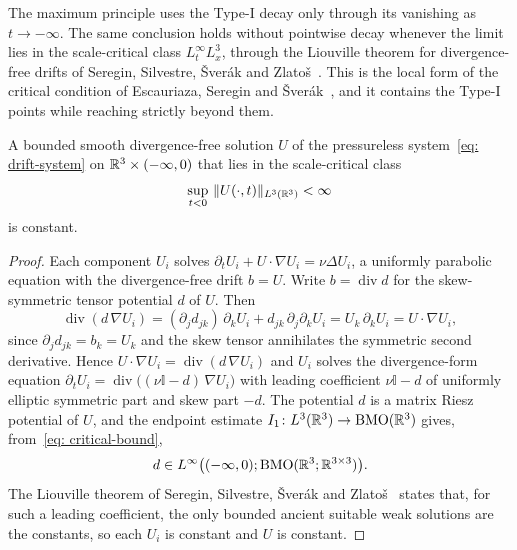 The maximum principle uses the Type-I decay only through its vanishing as
$t\to-\infty$. The same conclusion holds without pointwise decay whenever the limit
lies in the scale-critical class $L^\infty_t L^3_x$, through the Liouville theorem
for divergence-free drifts of Seregin, Silvestre, \v{S}ver\'ak and
Zlato\v{s}~\cite{seregin-2012-div-dri}. This is the local form of the
critical condition of Escauriaza, Seregin and
\v{S}ver\'ak~\cite{escauriaza-2003-l3i-nav-equ}, and it contains the Type-I points
while reaching strictly beyond them.

\begin{lemma}\label{lem: liouville-critical}
A bounded smooth divergence-free
solution $U$ of the pressureless system~\eqref{eq: drift-system} on
$\mathbb{R}^3\times(-\infty,0)$ that lies in the scale-critical class
\begin{equation}\label{eq: critical-bound}
  \sup_{t<0}\ \lVert U(\cdot,t) \rVert_{L^3(\mathbb{R}^3)} < \infty
\end{equation}
is constant.
\end{lemma}

\begin{proof}
Each component $U_i$ solves $\partial_t U_i + U\cdot\nabla U_i = \nu\Delta U_i$, a
uniformly parabolic equation with the divergence-free drift $b = U$. Write
$b = \operatorname{div}d$ for the skew-symmetric tensor potential $d$ of $U$. Then
\[
  \operatorname{div}(d\,\nabla U_i)
  = (\partial_j d_{jk})\,\partial_k U_i + d_{jk}\,\partial_j\partial_k U_i
  = U_k\,\partial_k U_i
  = U\cdot\nabla U_i,
\]
since $\partial_j d_{jk} = b_k = U_k$ and the skew tensor annihilates the symmetric
second derivative. Hence $U\cdot\nabla U_i = \operatorname{div}(d\,\nabla U_i)$ and
$U_i$ solves the divergence-form equation
$\partial_t U_i = \operatorname{div}\bigl((\nu\mathbb{I}-d)\,\nabla U_i\bigr)$ with
leading coefficient $\nu\mathbb{I}-d$ of uniformly elliptic symmetric part and skew
part $-d$. The potential $d$ is a matrix Riesz potential of $U$, and the endpoint
estimate $I_1\colon L^3(\mathbb{R}^3)\to\mathrm{BMO}(\mathbb{R}^3)$ gives, from~\eqref{eq: critical-bound},
\[
  d \in L^\infty\bigl((-\infty,0);\mathrm{BMO}(\mathbb{R}^3;\mathbb{R}^{3\times3})\bigr).
\]
The Liouville theorem of Seregin, Silvestre, \v{S}ver\'ak and
Zlato\v{s}~\cite{seregin-2012-div-dri} states that, for such a leading coefficient,
the only bounded ancient suitable weak solutions are the constants, so each $U_i$
is constant and $U$ is constant.
\end{proof}

